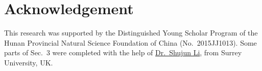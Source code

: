 \documentclass[final,3p,times,twocolumn]{elsarticle}
\begin{document}
\section*{Acknowledgement}

This research was supported by the Distinguished Young Scholar Program of the Hunan Provincial Natural Science Foundation of China (No.~2015JJ1013).
Some parts of Sec.~3 were completed with the help of \href{www.hooklee.com}{Dr.~Shujun Li}, from Surrey University, UK.




\end{document}
